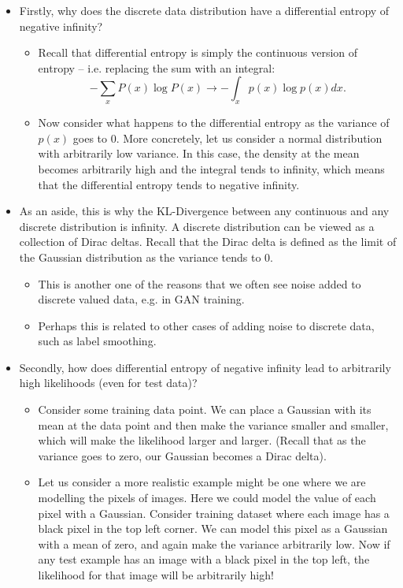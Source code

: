 \documentclass{article}
\begin{document}
\begin{itemize}
	\item Firstly, why does the discrete data distribution have a differential entropy of negative infinity? 
	\begin{itemize}
		\item Recall that differential entropy is simply the continuous version of entropy -- i.e. replacing the sum with an integral:
		\begin{equation}
		- \sum_x P(x) \log P(x) \rightarrow -\int_x p(x) \log p(x) dx. 
		\end{equation}
		\item Now consider what happens to the differential entropy as the variance of $p(x)$ goes to 0. More concretely, let us consider a normal distribution with arbitrarily low variance. In this case, the density at the mean becomes arbitrarily high and the integral tends to infinity, which means that the differential entropy tends to negative infinity. 
	\end{itemize}
	\item As an aside, this is why the KL-Divergence between any continuous and any discrete distribution is infinity. A discrete distribution can be viewed as a collection of Dirac deltas. Recall that the Dirac delta is defined as the limit of the Gaussian distribution as the variance tends to 0.
	\begin{itemize}
		\item This is another one of the reasons that we often see noise added to discrete valued data, e.g. in GAN training.
		\item Perhaps this is related to other cases of adding noise to discrete data, such as label smoothing.
	\end{itemize}
	\item Secondly, how does differential entropy of negative infinity lead to arbitrarily high likelihoods (even for test data)?
	\begin{itemize}
		\item Consider some training data point. We can place a Gaussian with its mean at the data point and then make the variance smaller and smaller, which will make the likelihood larger and larger. (Recall that as the variance goes to zero, our Gaussian becomes a Dirac delta).
		\item Let us consider a more realistic example might be one where we are modelling the pixels of images. Here we could model the value of each pixel with a Gaussian. Consider training dataset where each image has a black pixel in the top left corner. We can model this pixel as a Gaussian with a mean of zero, and again make the variance arbitrarily low. Now if any test example has an image with a black pixel in the top left, the likelihood for that image will be arbitrarily high!

\end{itemize}
\end{itemize}
\end{document}
